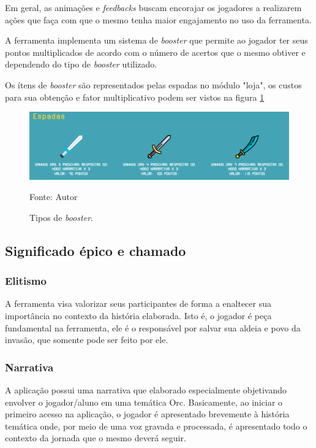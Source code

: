 Em geral, as animações e \textit{feedbacks} buscam encorajar os jogadores a realizarem ações que faça com que o mesmo tenha maior engajamento no uso
da ferramenta.

A ferramenta implementa um sistema de \textit{booster} que permite ao jogador ter seus pontos multiplicados
de acordo com o número de acertos que o mesmo obtiver e dependendo do tipo de \textit{booster} utilizado.

Os ítens de \textit{booster} são representados pelas espadas no módulo "loja", os custos para sua obtenção 
e fator multiplicativo podem ser vistos na figura \ref{espadas}

\begin{figure}[h]
	\centering
	\includegraphics[keepaspectratio=true,scale=0.4]{figuras/espadas.png}
	\caption{Tipos de \textit{booster}.}
	Fonte: Autor
	\label{espadas}
\end{figure}

\subsection{Significado épico e chamado}
\subsubsection{Elitismo}
A ferramenta visa valorizar seus participantes de forma a enaltecer sua importância no contexto da história 
elaborada. Isto é, o jogador é peça fundamental na ferramenta, ele é o responsável por salvar sua aldeia e povo
da invasão, que somente pode ser feito por ele.


\subsubsection{Narrativa}
A aplicação possui uma narrativa que elaborado especialmente objetivando envolver o jogador/aluno
em uma temática Orc. Basicamente, ao iniciar o primeiro acesso na aplicação, o jogador é apresentado brevemente à história temática onde,
por meio de uma voz gravada e processada, é apresentado todo o contexto da jornada que o mesmo deverá seguir.

